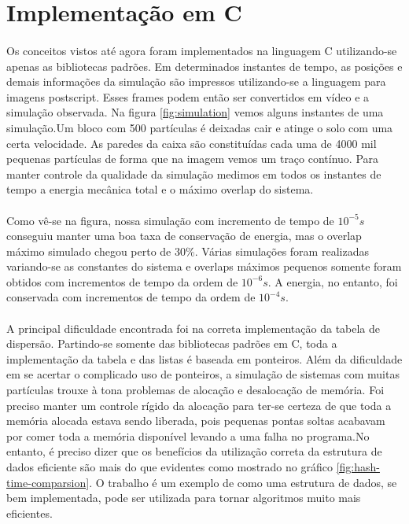 \documentclass[a4paper,11pt]{article}
\begin{document}
\section{Implementação em C}

\paragraph{}Os conceitos vistos até agora foram implementados na linguagem
C utilizando-se apenas as bibliotecas padrões. Em determinados instantes
de tempo, as posições e demais informações da simulação são impressos
utilizando-se a linguagem para imagens postscript. Esses frames podem então ser 
convertidos em vídeo e a simulação observada.
Na figura \ref{fig:simulation} vemos alguns instantes de uma simulação.Um bloco
com 500 partículas é deixadas cair e atinge o solo com uma certa velocidade.
As paredes da caixa são constituídas cada uma de 4000 mil pequenas partículas 
de forma que na imagem vemos um traço contínuo. Para manter controle da qualidade 
da simulação medimos em todos os instantes de tempo a energia mecânica total 
e o máximo overlap do sistema.

\paragraph{} Como vê-se na figura, nossa simulação com incremento de tempo de
$10^{-5}s$ conseguiu manter uma boa taxa de conservação de energia, mas o overlap
máximo simulado chegou perto de 30\%. Várias simulações foram realizadas
variando-se as constantes do sistema e overlaps máximos pequenos somente
foram obtidos com incrementos de tempo da ordem de $10^{-6}s$. A energia, 
no entanto, foi conservada com incrementos de tempo da ordem de $10^{-4}s$. 

\paragraph{}A principal dificuldade encontrada foi na correta implementação da
tabela de dispersão. Partindo-se somente das bibliotecas padrões em C, toda 
a implementação da tabela e das listas é baseada em ponteiros. Além da
dificuldade em se acertar o complicado uso de ponteiros, a simulação de 
sistemas com muitas partículas trouxe à tona problemas de alocação e desalocação
de memória. Foi preciso manter um controle rígido da alocação para ter-se
certeza de que toda a memória alocada estava sendo liberada, pois pequenas
pontas soltas acabavam por comer toda a memória disponível levando a uma 
falha no programa.No entanto, é preciso dizer que os benefícios da utilização
correta da estrutura de dados eficiente são mais do que evidentes como
mostrado no gráfico \ref{fig:hash-time-comparsion}. 
O trabalho é um exemplo de como uma estrutura de dados, se bem 
implementada, pode ser utilizada para tornar algoritmos muito mais eficientes.
\end{document}
